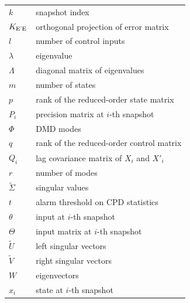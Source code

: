 \begin{table}[ht]
\begin{tabular}{p{2cm}l}
	\(k\)                          & snapshot index                                          \\
	\(K _{\text{E'E}}\)                & orthogonal projection of error matrix                   \\
	\(l\)                          & number of control inputs                                \\
	\(\lambda \)                   & eigenvalue                                              \\
	\(\Lambda \)                   & diagonal matrix of eigenvalues                          \\
	\(m\)                          & number of states                                        \\
	\(p\)                          & rank of the reduced-order state matrix                  \\
	\(P_i\)                        & precision matrix at \(i\)-th snapshot                   \\
	\(\Phi \)                      & DMD modes                                               \\
	\(q\)                          & rank of the reduced-order control matrix                \\
	\(Q_i\)                        & lag covariance matrix of \(X_i\) and \(X'_i\)           \\
	\(r\)                          & number of modes                                         \\
	\(\tilde{\Sigma} \)            & singular values                                         \\
	\(t\)                          & alarm threshold on CPD statistics                       \\
	\(\theta \)                    & input at \(i\)-th snapshot                              \\
	\(\Theta \)                    & input matrix at \(i\)-th snapshot                       \\
	\(\tilde{U}\)                  & left singular vectors                                   \\
	\(\tilde{V}\)                  & right singular vectors                                  \\
	\( W \)                        & eigenvectors                                            \\
	\(x_i\)                        & state at \(i\)-th snapshot                              \\

\end{tabular}
\end{table}
